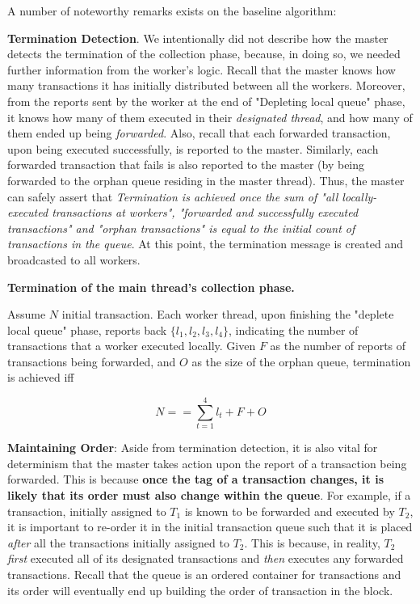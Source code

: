 A number of noteworthy remarks exists on the baseline algorithm:

\textbf{Termination Detection}. We intentionally did not describe how the master detects the
termination of the collection phase, because, in doing so, we needed further information from the
worker's logic. Recall that the master knows how many transactions it has initially
distributed between all the workers. Moreover, from the reports sent by the worker at the end of
"Depleting local queue" phase, it knows how many of them executed in their \textit{designated
thread}, and how many of them ended up being \textit{forwarded}. Also, recall that each forwarded
transaction, upon being executed successfully, is reported to the master. Similarly, each forwarded
transaction that fails is also reported to the master (by being forwarded to the orphan queue
residing in the master thread). Thus, the master can safely assert that \textit{Termination is achieved once
the sum of "all locally-executed transactions at workers", "forwarded and successfully executed
transactions" and "orphan transactions" is equal to the initial count of transactions in the queue}.
At this point, the termination message is created and broadcasted to all workers.

\begin{definition}
	\textbf{Termination of the main thread's collection phase. }

	Assume $N$ initial transaction. Each worker thread, upon finishing the "deplete local queue"
	phase, reports back $\{ l_{1}, l_{2}, l_{3}, l_{4} \}$, indicating the number of transactions
	that a worker executed locally. Given $F$ as the number of reports of transactions being
	forwarded, and $O$ as the size of the orphan queue, termination is achieved iff

	\begin{equation}
		N == \sum_{t = 1}^{4} l_{t} + F + O
	\end{equation}
\end{definition}


\textbf{Maintaining Order}: Aside from termination detection, it is also vital for determinism that
the master takes action upon the report of a transaction being forwarded. This is because
\textbf{once the tag of a transaction changes, it is likely that its order must also change within
the queue}. For example, if a transaction, initially assigned to $T_{1}$ is known to be forwarded
and executed by $T_{2}$, it is important to re-order it in the initial transaction queue such that
it is placed \textit{after} all the transactions initially assigned to $T_{2}$. This is because, in
reality, $T_{2}$ \textit{first} executed all of its designated transactions and \textit{then}
executes any forwarded transactions. Recall that the queue is an ordered container for transactions
and its order will eventually end up building the order of transaction in the block.

